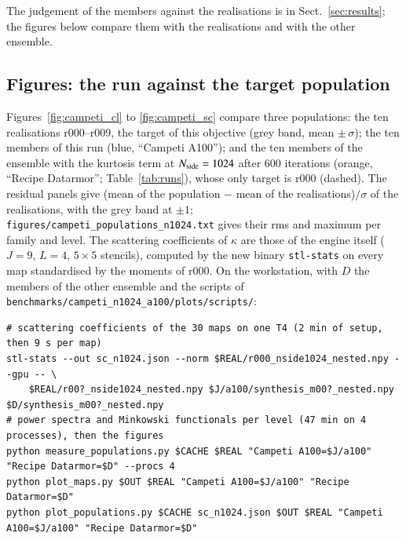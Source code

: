 \documentclass{aa}
\newcommand{\nside}{N_{\rm side}}
\begin{document}
The judgement of the members against the realisations is in Sect.~\ref{sec:results}; the figures below compare them with the realisations and with the other ensemble.

\subsection{Figures: the run against the target population}

Figures~\ref{fig:campeti_cl} to \ref{fig:campeti_sc} compare three populations: the ten realisations r000--r009, the target of this objective (grey band, mean $\pm\,\sigma$); the ten members of this run (blue, ``Campeti A100''); and the ten members of the ensemble with the kurtosis term at $\nside=1024$ after 600 iterations (orange, ``Recipe Datarmor''; Table~\ref{tab:runs}), whose only target is r000 (dashed). The residual panels give (mean of the population $-$ mean of the realisations)$/\sigma$ of the realisations, with the grey band at $\pm1$; \texttt{figures/campeti\_populations\_n1024.txt} gives their rms and maximum per family and level. The scattering coefficients of $\kappa$ are those of the engine itself ($J=9$, $L=4$, $5\times5$ stencils), computed by the new binary \texttt{stl-stats} on every map standardised by the moments of r000. On the workstation, with $D$ the members of the other ensemble and the scripts of \texttt{benchmarks/campeti\_n1024\_a100/plots/scripts/}:
\begin{lstlisting}
# scattering coefficients of the 30 maps on one T4 (2 min of setup, then 9 s per map)
stl-stats --out sc_n1024.json --norm $REAL/r000_nside1024_nested.npy --gpu -- \
    $REAL/r00?_nside1024_nested.npy $J/a100/synthesis_m00?_nested.npy $D/synthesis_m00?_nested.npy
# power spectra and Minkowski functionals per level (47 min on 4 processes), then the figures
python measure_populations.py $CACHE $REAL "Campeti A100=$J/a100" "Recipe Datarmor=$D" --procs 4
python plot_maps.py $OUT $REAL "Campeti A100=$J/a100" "Recipe Datarmor=$D"
python plot_populations.py $CACHE sc_n1024.json $OUT $REAL "Campeti A100=$J/a100" "Recipe Datarmor=$D"
\end{lstlisting}
\end{document}
